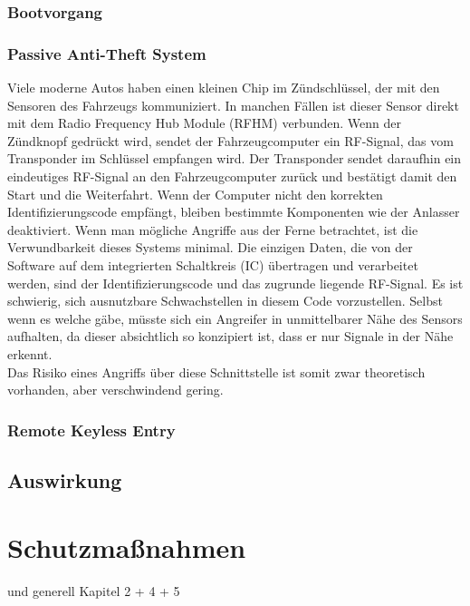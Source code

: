 \subsection{Bootvorgang}
\cite[82]{Wurm.2022}

\subsection{Passive Anti-Theft System}
Viele moderne Autos haben einen kleinen Chip im Zündschlüssel, der mit den Sensoren des Fahrzeugs kommuniziert. In manchen Fällen ist dieser Sensor direkt mit dem Radio Frequency Hub Module (RFHM) verbunden. Wenn der Zündknopf gedrückt wird, sendet der Fahrzeugcomputer ein RF-Signal, das vom Transponder im Schlüssel empfangen wird. Der Transponder sendet daraufhin ein eindeutiges RF-Signal an den Fahrzeugcomputer zurück und bestätigt damit den Start und die Weiterfahrt. Wenn der Computer nicht den korrekten Identifizierungscode empfängt, bleiben bestimmte Komponenten wie der Anlasser deaktiviert.
Wenn man mögliche Angriffe aus der Ferne betrachtet, ist die Verwundbarkeit dieses Systems minimal. Die einzigen Daten, die von der Software auf dem integrierten Schaltkreis (IC) übertragen und verarbeitet werden, sind der Identifizierungscode und das zugrunde liegende RF-Signal. Es ist schwierig, sich ausnutzbare Schwachstellen in diesem Code vorzustellen. Selbst wenn es welche gäbe, müsste sich ein Angreifer in unmittelbarer Nähe des Sensors aufhalten, da dieser absichtlich so konzipiert ist, dass er nur Signale in der Nähe erkennt.\cite[13]{Miller.2015} \\
Das Risiko eines Angriffs über diese Schnittstelle ist somit zwar theoretisch vorhanden, aber verschwindend gering.


\subsection{Remote Keyless Entry}
\cite{Garcia.2016}

\section{Auswirkung}
\cite[10]{Miller.2015}



\chapter{Schutzmaßnahmen}
\cite[42]{Wurm.2022} und generell Kapitel 2 + 4 + 5
\cite{MillerCharlie.2019}

